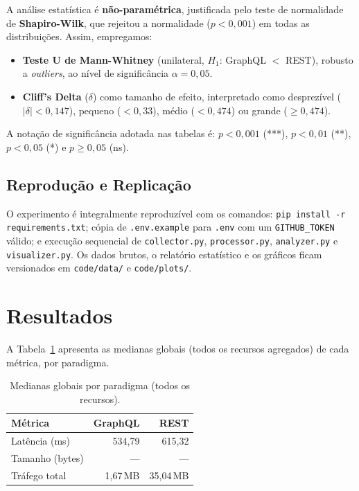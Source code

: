 \documentclass[10pt,a4paper,twocolumn]{article}
\begin{document}
A análise estatística é \textbf{não-paramétrica}, justificada pelo teste de
normalidade de \textbf{Shapiro-Wilk}, que rejeitou a normalidade
($p < 0{,}001$) em todas as distribuições. Assim, empregamos:

\begin{itemize}
  \item \textbf{Teste U de Mann-Whitney} (unilateral, $H_1$: GraphQL
    $<$ REST), robusto a \textit{outliers}, ao nível de significância
    $\alpha = 0{,}05$.
  \item \textbf{Cliff's Delta} ($\delta$) como tamanho de efeito, interpretado
    como desprezível ($|\delta|<0{,}147$), pequeno ($<0{,}33$), médio
    ($<0{,}474$) ou grande ($\geq 0{,}474$).
\end{itemize}

A notação de significância adotada nas tabelas é: $p<0{,}001$ (***),
$p<0{,}01$ (**), $p<0{,}05$ (*) e $p\geq 0{,}05$ (ns).

\subsection{Reprodução e Replicação}

O experimento é integralmente reproduzível com os comandos:
\texttt{pip install -r requirements.txt}; cópia de \texttt{.env.example} para
\texttt{.env} com um \texttt{GITHUB\_TOKEN} válido; e execução sequencial de
\texttt{collector.py}, \texttt{processor.py}, \texttt{analyzer.py} e
\texttt{visualizer.py}. Os dados brutos, o relatório estatístico e os gráficos
ficam versionados em \texttt{code/data/} e \texttt{code/plots/}.

\section{Resultados}

A Tabela~\ref{tab:global} apresenta as medianas globais (todos os recursos
agregados) de cada métrica, por paradigma.

\begin{table}[H]
  \centering
  \caption{Medianas globais por paradigma (todos os recursos).}
  \label{tab:global}
  \small
  \begin{tabular}{lrr}
    \toprule
    \textbf{Métrica} & \textbf{GraphQL} & \textbf{REST} \\
    \midrule
    Latência (ms) & 534,79 & 615,32 \\
    Tamanho (bytes) & --- & --- \\
    \quad Tráfego total & 1,67\,MB & 35,04\,MB \\
    \bottomrule
  \end{tabular}
\end{table}
\end{document}
